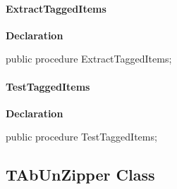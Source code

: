 \documentclass{report}
\newif\ifpdf
\begin{document}
\paragraph*{ExtractTaggedItems}\hspace*{\fill}

\label{AbUnzper.TAbCustomUnZipper-ExtractTaggedItems}
\begin{list}{}{
\setlength{\itemindent}{0cm}
\setlength{\listparindent}{0cm}
\setlength{\leftmargin}{\evensidemargin}
\addtolength{\leftmargin}{\tmplength}
\settowidth{\labelsep}{X}
\addtolength{\leftmargin}{\labelsep}
\setlength{\labelwidth}{\tmplength}
}
\item[\textbf{Declaration}\hfill]
\ifpdf
\begin{flushleft}
\fi
\begin{ttfamily}
public procedure ExtractTaggedItems;\end{ttfamily}

\ifpdf
\end{flushleft}
\fi

\end{list}
\paragraph*{TestTaggedItems}\hspace*{\fill}

\label{AbUnzper.TAbCustomUnZipper-TestTaggedItems}
\begin{list}{}{
\setlength{\itemindent}{0cm}
\setlength{\listparindent}{0cm}
\setlength{\leftmargin}{\evensidemargin}
\addtolength{\leftmargin}{\tmplength}
\settowidth{\labelsep}{X}
\addtolength{\leftmargin}{\labelsep}
\setlength{\labelwidth}{\tmplength}
}
\item[\textbf{Declaration}\hfill]
\ifpdf
\begin{flushleft}
\fi
\begin{ttfamily}
public procedure TestTaggedItems;\end{ttfamily}

\ifpdf
\end{flushleft}
\fi

\end{list}
\ifpdf
\subsection*{\large{\textbf{TAbUnZipper Class}}\normalsize\hspace{1ex}\hrulefill}
\else
\end{document}
